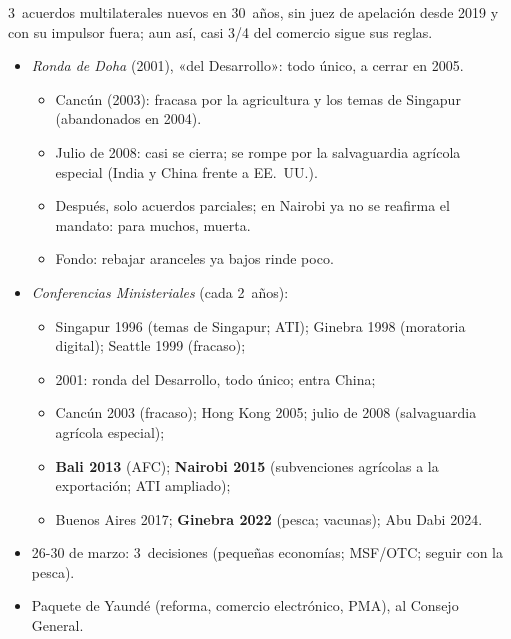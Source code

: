 \documentclass{article}
\begin{document}
\begin{columnas}
\begin{ideaclave}
3~acuerdos multilaterales nuevos en 30~años, sin juez de apelación desde 2019 y con su impulsor fuera; aun así, casi 3/4 del comercio sigue sus reglas.
\end{ideaclave}

\begin{itemize}
\item \emph{Ronda de Doha} (2001), «del Desarrollo»: todo único, a cerrar en 2005.
  \begin{itemize}
  \item Cancún (2003): fracasa por la agricultura y los temas de Singapur (abandonados en 2004).
  \item Julio de 2008: casi se cierra; se rompe por la salvaguardia agrícola especial (India y China frente a EE.~UU.).
  \item Después, solo acuerdos parciales; en Nairobi ya no se reafirma el mandato: para muchos, muerta.
  \item Fondo: rebajar aranceles ya bajos rinde poco.
  \end{itemize}
\item \emph{Conferencias Ministeriales} (cada 2~años):
  \begin{itemize}
  \item Singapur 1996 (temas de Singapur; ATI); Ginebra 1998 (moratoria digital); Seattle 1999 (fracaso);
  \item {} 2001: ronda del Desarrollo, todo único; entra China;
  \item Cancún 2003 (fracaso); Hong Kong 2005; julio de 2008 (salvaguardia agrícola especial);
  \item \textbf{Bali 2013} (AFC); \textbf{Nairobi 2015} (subvenciones agrícolas a la exportación; ATI ampliado);
  \item Buenos Aires 2017; \textbf{Ginebra 2022} (pesca; vacunas); Abu Dabi 2024.
  \end{itemize}
\end{itemize}
\begin{itemize}
\item 26-30 de marzo: 3~decisiones (pequeñas economías; MSF/OTC; seguir con la pesca).
\item Paquete de Yaundé (reforma, comercio electrónico, PMA), al Consejo General.

\end{itemize}
\end{columnas}
\end{document}
